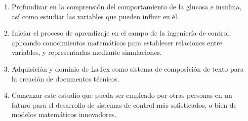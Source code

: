 \begin{enumerate}
    \item Profundizar en la comprensión del comportamiento de la glucosa e insulina, así como estudiar las variables que pueden influir en él.
    \item Iniciar el proceso de aprendizaje en el campo de la ingeniería de control, aplicando conocimientos matemáticos para establecer relaciones entre variables, y representarlas mediante simulaciones.
    \item Adquisición y dominio de LaTex como sistema de composición de texto para la creación de documentos técnicos.
    \item Comenzar este estudio que pueda ser empleado por otras personas en un futuro para el desarrollo de sistemas de control más sofisticados, o bien de modelos matemáticos innovadores.
\end{enumerate}












